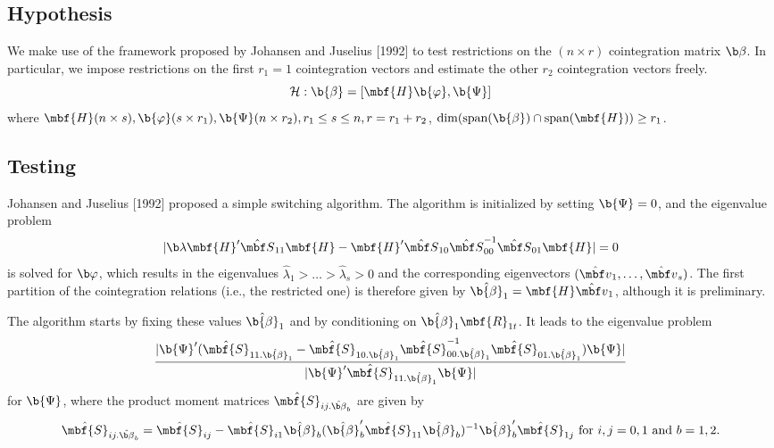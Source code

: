\subsection{Hypothesis}

We make use of the framework proposed by Johansen and Juselius [1992] to test restrictions on the $(n\times r)$ cointegration matrix $\b \beta$. In particular, we impose restrictions on the first $r_1=1$ cointegration vectors and estimate the other $r_2$ cointegration vectors freely.
$$
\mathcal{H} : \b{\beta} = [\mbf{H}\b{\varphi},\b{\Psi}]
$$
where $ \mbf{H}(n \times s), \b{\varphi}(s \times r_1), \b{\Psi}(n \times r_2), r_1 \leq s \leq n, r = r_1 + r_2$, $
\dim(\text{span}(\b{\beta}) \cap \text{span}(\mbf{H})) \geq r_1$. 

\subsection{Testing}
Johansen and Juselius [1992] proposed a simple switching algorithm. The algorithm is initialized by setting $\b{\Psi} = 0$, and the eigenvalue problem
\begin{equation}
|\b \lambda\mbf{H}'\hat{\mbf S}_{11}\mbf{H} - \mbf{H}'\hat{\mbf S}_{10}\hat{\mbf S}_{00}^{-1}\hat{\mbf S}_{01}\mbf{H}| = 0 
\end{equation}
is solved for $\b \varphi$, which results in the eigenvalues $\hat{\lambda}_1 > \ldots > \hat{\lambda}_s > 0$ and the corresponding eigenvectors $(\hat{\mbf v}_1,\ldots,\hat{\mbf v}_s)$. The first partition of the cointegration relations (i.e., the restricted one) is therefore given by $\hat{\b{\beta}}_1 = \mbf{H} \hat{\mbf v}_1$, although it is preliminary.

The algorithm starts by fixing these values $\hat{\b{\beta}}_1$ and by conditioning on $\hat{\b{\beta}}_1\mbf{R}_{1t}$. It leads to the eigenvalue problem
\begin{equation*}
\frac{|\b{\Psi}'(\hat{\mbf{S}}_{11.\hat{\b{\beta}}_1} - \hat{\mbf{S}}_{10.\hat{\b{\beta}}_1}\hat{\mbf{S}}_{00.\hat{\b{\beta}}_1}^{-1}\hat{\mbf{S}}_{01.\hat{\b{\beta}}_1})\b{\Psi}|}{|\b{\Psi}'\hat{\mbf{S}}_{11.\hat{\b{\beta}}_1}\b{\Psi}|}
\end{equation*}
for $\b{\Psi}$, where the product moment matrices $\hat{\mbf{S}}_{ij.\hat{\b \beta}_b}$ are given by
\begin{equation}\label{eq:8_18}
\hat{\mbf{S}}_{ij.\hat{\b \beta}_b}= \hat{\mbf{S}}_{ij} - \hat{\mbf{S}}_{i1}\hat{\b{\beta}}_b(\hat{\b{\beta}}_b'\hat{\mbf{S}}_{11}\hat{\b{\beta}}_b)^{-1}\hat{\b{\beta}}_b'\hat{\mbf{S}}_{1j} \text{ for } i,j = 0,1 \text{ and } b = 1,2.
\end{equation}

